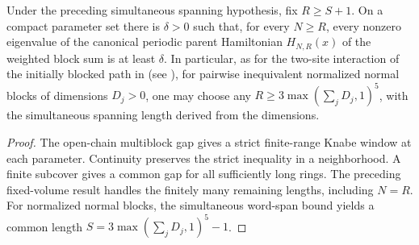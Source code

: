 \begin{lemma}
    \label{thm:compact_block_parent_gap}
    \leanok
    Under the preceding simultaneous spanning hypothesis, fix
    $R\geq S+1$. On a compact parameter set there is $\delta>0$ such
    that, for every $N\geq R$, every nonzero eigenvalue of the canonical
    periodic parent Hamiltonian $H_{N,R}(x)$ of the weighted block sum is at
    least $\delta$.
    In particular, as for the two-site interaction of the initially blocked
    path in \cite[Appendix~A]{Schuch2011Phases} (see
    \cite{gap:spc11_uniform_gap_injective_scope}), for pairwise inequivalent
    normalized normal blocks of dimensions $D_j>0$, one may choose any
    $R\geq3\max(\sum_jD_j,1)^5$, with the simultaneous spanning length
    derived from the dimensions.
\end{lemma}

\begin{proof}
    \leanok
    The open-chain multiblock gap gives a strict finite-range Knabe window
    at each parameter. Continuity preserves the strict inequality in a
    neighborhood. A finite subcover gives a common gap for all sufficiently
    long rings. The preceding fixed-volume result handles the finitely
    many remaining lengths, including $N=R$. For normalized normal blocks,
    the simultaneous word-span bound yields a common length
    $S=3\max(\sum_jD_j,1)^5-1$.
\end{proof}

